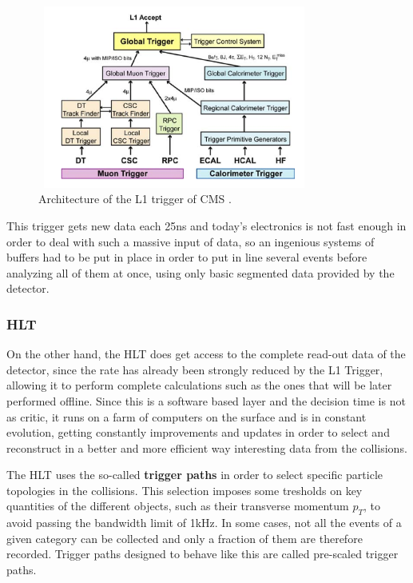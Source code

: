 \documentclass[a4paper, 10pt, openright]{report}
\begin{document}
\begin{figure}[htbp]
\begin{center}
\includegraphics[width=9cm, height=6cm]{figs/L1Trigg.png}
\caption{Architecture of the \ac{L1} trigger of \ac{CMS} \cite{CMSDescription}.}
\label{fig:L1Trigg}
\end{center}
\end{figure}

This trigger gets new data each 25ns and today's electronics is not fast enough in order to deal with such a massive input of data, so an ingenious systems of buffers had to be put in place in order to put in line several events before analyzing all of them at once, using only basic segmented data provided by the detector.

\subsubsection*{\acf{HLT}}

On the other hand, the \ac{HLT} \cite{HLT} does get access to the complete read-out data of the detector, since the rate has already been strongly reduced by the \ac{L1} Trigger, allowing it to perform complete calculations such as the ones that will be later performed offline. Since this is a software based layer and the decision time is not as critic, it runs on a farm of computers on the surface and is in constant evolution, getting constantly improvements and updates in order to select and reconstruct in a better and more efficient way interesting data from the collisions.

The \ac{HLT} uses the so-called \textbf{trigger paths} in order to select specific particle topologies in the collisions. This selection imposes some tresholds on key quantities of the different objects, such as their transverse momentum $p_T$, to avoid passing the bandwidth limit of 1kHz. In some cases, not all the events of a given category can be collected and only a fraction of them are therefore recorded. Trigger paths designed to behave like this are called pre-scaled trigger paths.
\end{document}
